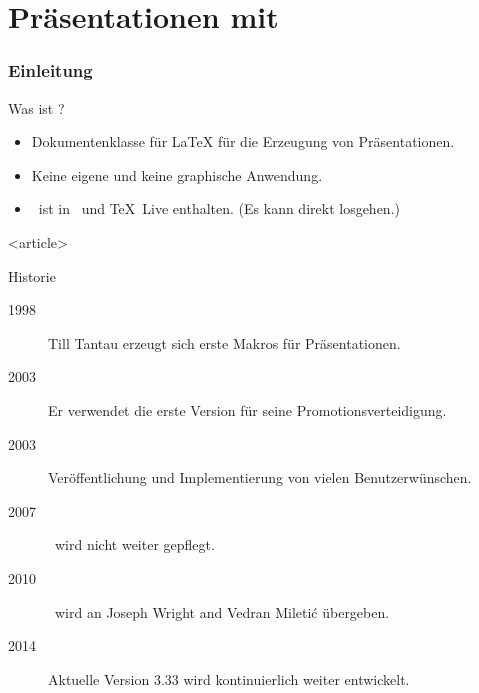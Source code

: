 \malte

\label{chapter-beamer}
\chapter{Präsentationen mit \beamer}


\website

\jonny


\subsection{Einleitung}

\begin{Frame}{Was ist \beamer?}
  \begin{itemize}
    \item \alert{Dokumentenklasse für \LaTeX} für die Erzeugung von Präsentationen.
    \item Keine eigene und \alert{keine graphische Anwendung}.
    \item \strut\beamer\ ist in \MiKTeX\ und \TeX\ Live enthalten.\newline
      (\alert{Es kann direkt losgehen}.)
  \end{itemize}
\end{Frame}

\mode
<article>

\begin{Frame}{Historie}
  \begin{description}
    \item[1998] Till Tantau erzeugt sich erste Makros für Präsentationen.
    \item[2003] Er verwendet die erste Version für seine Promotionsverteidigung.
    \item[2003] Veröffentlichung und Implementierung von vielen Benutzerwünschen.
    \item[2007] \beamer\ wird nicht weiter gepflegt.
    \item[2010] \beamer\ wird an Joseph Wright and Vedran Mileti\'c übergeben.
    \item[2014] Aktuelle Version 3.33 wird kontinuierlich weiter entwickelt.
  \end{description}
\end{Frame}

